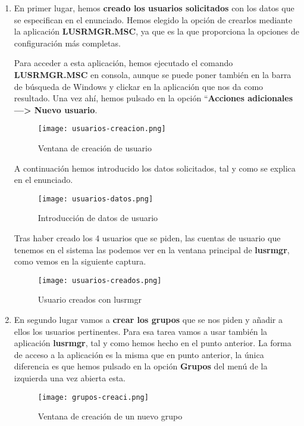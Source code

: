 \begin{enumerate}
    \item En primer lugar, hemos \textbf{creado los usuarios solicitados} con los datos que se especifican en el enunciado. Hemos elegido la opción de crearlos mediante la aplicación \textbf{LUSRMGR.MSC}, ya que es la que proporciona la opciones de configuración más completas.

    Para acceder a esta aplicación, hemos ejecutado el comando \textbf{LUSRMGR.MSC} en consola, aunque se puede poner también en la barra de búsqueda de Windows y clickar en la aplicación que nos da como resultado. Una vez ahí, hemos pulsado en la opción ``\textbf{Acciones adicionales ---> Nuevo usuario}.

     \begin{figure}[H]
        \centering
        \texttt{[image: usuarios-creacion.png]}
        \caption{Ventana de creación de usuario}
    \end{figure}

    A continuación hemos introducido los datos solicitados, tal y como se explica en el enunciado.

    \begin{figure}[H]
        \centering
        \texttt{[image: usuarios-datos.png]}
        \caption{Introducción de datos de usuario}
    \end{figure}

    Tras haber creado los 4 usuarios que se piden, las cuentas de usuario que tenemos en el sistema las podemos ver en la ventana principal de \textbf{lusrmgr}, como vemos en la siguiente captura.

    \begin{figure}[H]
        \centering
        \texttt{[image: usuarios-creados.png]}
        \caption{Usuario creados con lusrmgr}
    \end{figure}

    \item En segundo lugar vamos a \textbf{crear los grupos} que se nos piden y añadir a ellos los usuarios pertinentes. Para esa tarea vamos a usar también la aplicación \textbf{lusrmgr}, tal y como hemos hecho en el punto anterior. La forma de acceso a la aplicación es la misma que en punto anterior, la única diferencia es que hemos pulsado en la opción \textbf{Grupos} del menú de la izquierda una vez abierta esta.

    \begin{figure}[H]
        \centering
        \texttt{[image: grupos-creaci.png]}
        \caption{Ventana de creación de un nuevo grupo}
    \end{figure}


\end{enumerate}
